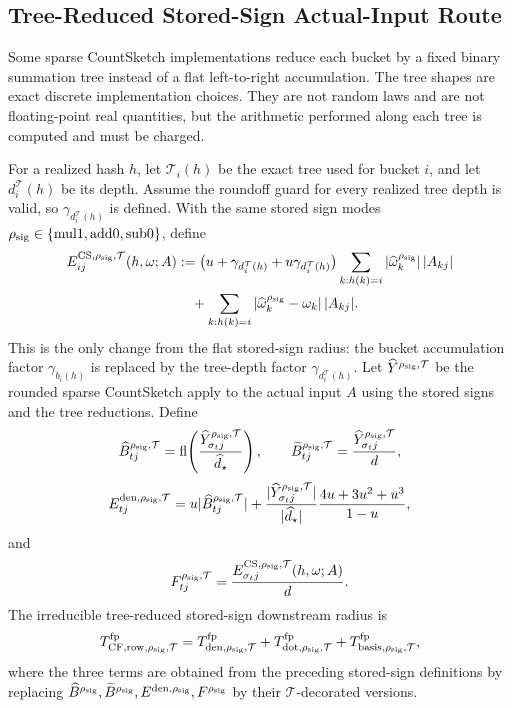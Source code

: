 \documentclass[11pt]{article}
\newcommand{\fl}{\operatorname{fl}}
\theoremstyle{remark}
\begin{document}
\subsection*{Tree-Reduced Stored-Sign Actual-Input Route}

Some sparse CountSketch implementations reduce each bucket by a fixed binary
summation tree instead of a flat left-to-right accumulation.  The tree shapes
are exact discrete implementation choices.  They are not random laws and are
not floating-point real quantities, but the arithmetic performed along each
tree is computed and must be charged.

For a realized hash \(h\), let \(\mathcal T_i(h)\) be the exact tree used for
bucket \(i\), and let \(d_i^{\mathcal T}(h)\) be its depth.  Assume the
roundoff guard for every realized tree depth is valid, so
\(\gamma_{d_i^{\mathcal T}(h)}\) is defined.  With the same stored sign modes
\(\rho_{\rm sig}\in\{\mathrm{mul1},\mathrm{add0},\mathrm{sub0}\}\), define
\[
\begin{aligned}
  E^{{\rm CS},\rho_{\rm sig},\mathcal T}_{ij}(h,\omega;A)
  &:=
  \bigl(u+\gamma_{d_i^{\mathcal T}(h)}
        +u\gamma_{d_i^{\mathcal T}(h)}\bigr)
  \sum_{k:h(k)=i}
      |\widehat\omega_k^{\rho_{\rm sig}}|\,|A_{kj}|\\
  &\quad+
  \sum_{k:h(k)=i}
      |\widehat\omega_k^{\rho_{\rm sig}}-\omega_k|\,|A_{kj}| .
\end{aligned}
\]
This is the only change from the flat stored-sign radius: the bucket
accumulation factor \(\gamma_{b_i(h)}\) is replaced by the tree-depth factor
\(\gamma_{d_i^{\mathcal T}(h)}\).  Let
\(\widehat Y^{\rho_{\rm sig},\mathcal T}\) be the rounded sparse CountSketch
apply to the actual input \(A\) using the stored signs and the tree reductions.
Define
\[
  \widehat B^{\rho_{\rm sig},\mathcal T}_{tj}
  =
  \fl\!\left(
    \frac{\widehat Y^{\rho_{\rm sig},\mathcal T}_{\sigma_tj}}
         {\widehat d_\star}\right),
  \qquad
  \widetilde B^{\rho_{\rm sig},\mathcal T}_{tj}
  =
  \frac{\widehat Y^{\rho_{\rm sig},\mathcal T}_{\sigma_tj}}{d},
\]
\[
  E^{{\rm den},\rho_{\rm sig},\mathcal T}_{tj}
  =
  u|\widehat B^{\rho_{\rm sig},\mathcal T}_{tj}|
  +
  \frac{|\widehat Y^{\rho_{\rm sig},\mathcal T}_{\sigma_tj}|}
       {|\widehat d_\star|}
  \frac{4u+3u^2+u^3}{1-u},
\]
and
\[
  F^{\rho_{\rm sig},\mathcal T}_{tj}
  =
  \frac{E^{{\rm CS},\rho_{\rm sig},\mathcal T}_{\sigma_tj}
        (h,\omega;A)}{d}.
\]
The irreducible tree-reduced stored-sign downstream radius is
\[
  T_{{\rm CF,row},\rho_{\rm sig},\mathcal T}^{\rm fp}
  =
  T_{{\rm den},\rho_{\rm sig},\mathcal T}^{\rm fp}
  +
  T_{{\rm dot},\rho_{\rm sig},\mathcal T}^{\rm fp}
  +
  T_{{\rm basis},\rho_{\rm sig},\mathcal T}^{\rm fp},
\]
where the three terms are obtained from the preceding stored-sign definitions
by replacing
\(\widehat B^{\rho_{\rm sig}},\widetilde B^{\rho_{\rm sig}},
E^{{\rm den},\rho_{\rm sig}},F^{\rho_{\rm sig}}\) by their
\(\mathcal T\)-decorated versions.
\end{document}
